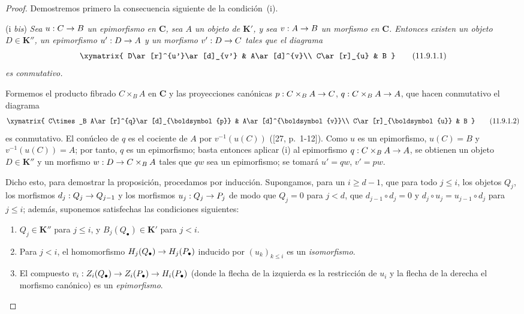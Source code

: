 \documentclass[10pt,oneside,openany]{book}
\theoremstyle{egaenv}\newtheorem*{env}{---}
\theoremstyle{egastatement}
\theoremstyle{egadescription}
\newcommand{\oldpage}[2][]{\marginnote{\normalfont\scriptsize\textbf{#1}\,|\,#2}\ignorespaces}
\renewcommand{\leq}{\leqslant}
\renewcommand{\geq}{\geqslant}
\renewcommand{\to}{\mathchoice{\longrightarrow}{\rightarrow}{\rightarrow}{\rightarrow}}
\begin{document}
\begin{proof}
Demostremos primero la consecuencia siguiente de la condición~(i).

\medskip\noindent
(i \emph{bis})
\emph{Sea $u:C\to B$ un epimorfismo en $\boldsymbol{C}$, sea $A$ un
objeto de $\boldsymbol{K}'$, y sea $v:A\to B$ un morfismo en $\boldsymbol{C}$.
Entonces existen un objeto $D\in\boldsymbol{K}''$, un epimorfismo $u':D\to A$ y un
morfismo $v':D\to C$ tales que el diagrama}
\[
\xymatrix{
D\ar[r]^{u'}\ar[d]_{v'} & A\ar[d]^{v}\\
C\ar[r]_{u} & B
}
\tag{11.9.1.1}\label{0.11.9.1.1-fr}
\]
\emph{es conmutativo.}

Formemos el producto fibrado $C\times_B A$ en $\boldsymbol{C}$ y las proyecciones canónicas $p:C\times_B A\to C$, $q:C\times_B A\to A$, que hacen conmutativo el diagrama
\oldpage[0\textsubscript{III}]{47}
\[
\xymatrix{
C\times_B A\ar[r]^{q}\ar[d]_{\boldsymbol{p}} & A\ar[d]^{\boldsymbol{v}}\\
C\ar[r]_{\boldsymbol{u}} & B
}
\tag{11.9.1.2}\label{0.11.9.1.2-fr}
\]
es conmutativo.
El conúcleo de $q$ es el cociente de $A$ por $v^{-1}(u(C))$
([27, p.~1-12]).
Como $u$ es un epimorfismo, $u(C)=B$ y
$v^{-1}(u(C))=A$; por tanto, $q$ es un epimorfismo; basta entonces aplicar (i) al epimorfismo $q:C\times_B A\to A$, se obtienen un objeto
$D\in\boldsymbol{K}''$ y un morfismo $w:D\to C\times_B A$ tales que $qw$ sea un epimorfismo; se tomará $u'=qw$, $v'=pw$.

Dicho esto, para demostrar la proposición, procedamos por inducción. Supongamos, para un $i\geq d-1$, que para todo $j\leq i$, los objetos $Q_j$, los morfismos $d_j:Q_j\to Q_{j-1}$ y los morfismos $u_j:Q_j\to P_j$ de modo que $Q_j=0$ para $j<d$, que $d_{j-1}\circ d_j=0$ y $d_j\circ u_j=u_{j-1}\circ d_j$ para $j\leq i$; además, suponemos satisfechas las condiciones siguientes:
\begin{enumerate}
\item[$(\mathrm I_i)$]
  $Q_j\in\boldsymbol{K}''$ para $j\leq i$, y
  $B_j(Q_\bullet)\in\boldsymbol{K}'$ para $j<i$.

  \item[$(\mathrm{II}_i)$]
  Para $j<i$, el homomorfismo
  $H_j(Q_\bullet)\to H_j(P_\bullet)$
  inducido por $(u_k)_{k\leq i}$ es un \emph{isomorfismo}.

  \item[$(\mathrm{III}_i)$]
  El compuesto
  $v_i:Z_i(Q_\bullet)\to Z_i(P_\bullet)
\to H_i(P_\bullet)$
(donde la flecha de la izquierda es la restricción de $u_i$ y la flecha de la derecha el morfismo canónico) es un \emph{epimorfismo}.
\end{enumerate}


\end{proof}
\end{document}

